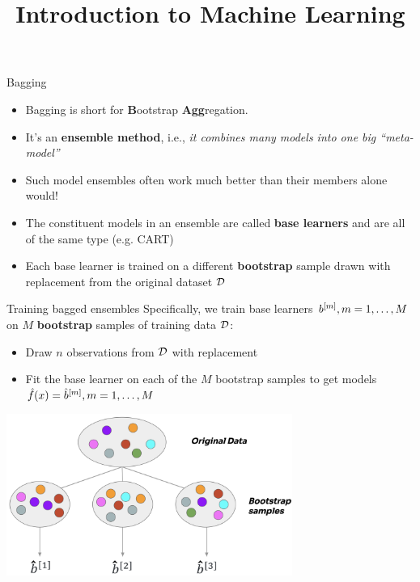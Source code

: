 \documentclass[11pt,compress,t,notes=noshow, xcolor=table]{beamer}
\title{Introduction to Machine Learning}
\institute{\href{https://compstat-lmu.github.io/lecture_i2ml/}{compstat-lmu.github.io/lecture\_i2ml}}
\date{}
\begin{document}
\sloppy


\begin{vbframe}{Bagging}

\begin{itemize}
  \item Bagging is short for \textbf{B}ootstrap \textbf{Agg}regation.
  \item It's an \textbf{ensemble method}, i.e., \textit{it combines many models into one big \enquote{meta-model}}
  \item Such model ensembles often work much better than their members alone would!
  \item The constituent models in an ensemble are called \textbf{base learners} and are all of the same type (e.g. CART)
  \item Each base learner is trained on a different \textbf{bootstrap} sample drawn with replacement from the original dataset $\mathcal{D}$
\end{itemize}

\end{vbframe}

\begin{vbframe}{Training bagged ensembles}
Specifically, we train base learners $b^{[m]}, m = 1, \dots, M$ on $M$ \textbf{bootstrap} samples of training data $\mathcal{D}$:
\begin{itemize}
  \item Draw $n$ observations from $\mathcal{D}$ with replacement
  \item Fit the base learner on each of the $M$ bootstrap samples to get models $\hat{f}(x) = \hat{b}^{[m]}, m = 1, \dots, M$
\end{itemize}

\begin{center}
\includegraphics[width=0.7\textwidth]{figure_man/forest-bagging.png}
\end{center}

\end{vbframe}
\end{document}
